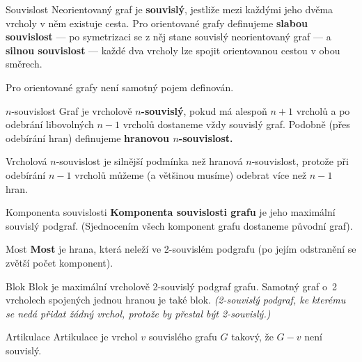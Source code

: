 \begin{definiceN}{Souvislost}
Neorientovaný graf je \textbf{souvislý}, jestliže mezi každými jeho dvěma vrcholy v něm existuje cesta. Pro orientované grafy definujeme \textbf{slabou souvislost} --- po symetrizaci se z něj stane souvislý neorientovaný graf --- a \textbf{silnou souvislost} --- každé dva vrcholy lze spojit orientovanou cestou v obou směrech.
\end{definiceN}

\begin{poznamka}
Pro orientované grafy není samotný pojem  definován.
\end{poznamka}

\begin{definiceN}{$n$-souvislost}
Graf je vrcholově \textbf{$n$-souvislý}, pokud má alespoň $n+1$ vrcholů a po odebrání libovolných $n-1$ vrcholů dostaneme vždy souvislý graf. Podobně (přes odebírání hran) definujeme \textbf{hranovou $n$-souvislost.}
\end{definiceN}

\begin{poznamka}
Vrcholová $n$-souvislost je silnější podmínka než hranová $n$-souvislost, protože při odebírání $n-1$ vrcholů můžeme (a většinou musíme) odebrat více než $n-1$ hran.
\end{poznamka}

\begin{definiceN}{Komponenta souvislosti}
\textbf{Komponenta souvislosti grafu} je jeho maximální souvislý podgraf. (Sjednocením všech komponent grafu dostaneme původní graf).
\end{definiceN}

\begin{definiceN}{Most}
\textbf{Most} je hrana, která neleží ve 2-souvislém podgrafu (po jejím odstranění se zvětší počet komponent).
\end{definiceN}

\begin{definiceN}{Blok}
Blok je maximální vrcholově 2-souvislý podgraf grafu. Samotný graf o~2 vrcholech spojených jednou hranou je také blok. \textit{(2-souvislý podgraf, ke kterému se nedá přidat žádný vrchol, protože by přestal být 2-souvislý.)}
\end{definiceN}

\begin{definiceN}{Artikulace}
Artikulace je vrchol $v$ souvislého grafu $G$ takový, že $G - v$ není souvislý.
\end{definiceN}
%

